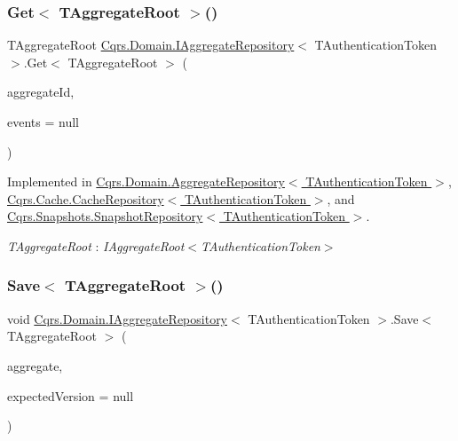 \subsubsection{\texorpdfstring{Get$<$ T\+Aggregate\+Root $>$()}{Get< TAggregateRoot >()}}
{\footnotesize\ttfamily T\+Aggregate\+Root \hyperlink{interfaceCqrs_1_1Domain_1_1IAggregateRepository}{Cqrs.\+Domain.\+I\+Aggregate\+Repository}$<$ T\+Authentication\+Token $>$.Get$<$ T\+Aggregate\+Root $>$ (\begin{DoxyParamCaption}\item[{Guid}]{aggregate\+Id,  }\item[{I\+List$<$ \hyperlink{interfaceCqrs_1_1Events_1_1IEvent}{I\+Event}$<$ T\+Authentication\+Token $>$$>$}]{events = {\ttfamily null} }\end{DoxyParamCaption})}



Implemented in \hyperlink{classCqrs_1_1Domain_1_1AggregateRepository_a0e55881812d463129df34189d29544b6_a0e55881812d463129df34189d29544b6}{Cqrs.\+Domain.\+Aggregate\+Repository$<$ T\+Authentication\+Token $>$}, \hyperlink{classCqrs_1_1Cache_1_1CacheRepository_a037acba636aedf23ff376ac0b749ec0c_a037acba636aedf23ff376ac0b749ec0c}{Cqrs.\+Cache.\+Cache\+Repository$<$ T\+Authentication\+Token $>$}, and \hyperlink{classCqrs_1_1Snapshots_1_1SnapshotRepository_acdbea47afc87de1da613a6eff3ceef0f_acdbea47afc87de1da613a6eff3ceef0f}{Cqrs.\+Snapshots.\+Snapshot\+Repository$<$ T\+Authentication\+Token $>$}.

\begin{Desc}
\item[Type Constraints]\begin{description}
\item[{\em T\+Aggregate\+Root} : {\em I\+Aggregate\+Root$<$T\+Authentication\+Token$>$}]\end{description}
\end{Desc}
\mbox{\label{interfaceCqrs_1_1Domain_1_1IAggregateRepository_a306baf8aa6faabe893f93e5db5d3517d_a306baf8aa6faabe893f93e5db5d3517d}} 
\subsubsection{\texorpdfstring{Save$<$ T\+Aggregate\+Root $>$()}{Save< TAggregateRoot >()}}
{\footnotesize\ttfamily void \hyperlink{interfaceCqrs_1_1Domain_1_1IAggregateRepository}{Cqrs.\+Domain.\+I\+Aggregate\+Repository}$<$ T\+Authentication\+Token $>$.Save$<$ T\+Aggregate\+Root $>$ (\begin{DoxyParamCaption}\item[{T\+Aggregate\+Root}]{aggregate,  }\item[{int?}]{expected\+Version = {\ttfamily null} }\end{DoxyParamCaption})}



